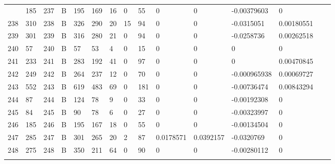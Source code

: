 \begin{longtable}{lllllllllllllll}
\begin{comment}
	237 & 185               & 237 & B   & 195               & 169               & 16                & 0    & 55         & 0              & 0              & -0.00379603   & 0            \\
	238 & 310               & 238 & B   & 326               & 290               & 20                & 15   & 94         & 0              & 0              & -0.0315051    & 0.00180551   \\
	239 & 301               & 239 & B   & 316               & 280               & 21                & 0    & 94         & 0              & 0              & -0.0258736    & 0.00262518   \\
	240 & 57                & 240 & B   & 57                & 53                & 4                 & 0    & 15         & 0              & 0              & 0             & 0            \\
	241 & 233               & 241 & B   & 283               & 192               & 41                & 0    & 97         & 0              & 0              & 0             & 0.00470845   \\
	242 & 249               & 242 & B   & 264               & 237               & 12                & 0    & 70         & 0              & 0              & -0.000965938  & 0.00069727   \\
	243 & 552               & 243 & B   & 619               & 483               & 69                & 0    & 181        & 0              & 0              & -0.00736474   & 0.00843294   \\
	244 & 87                & 244 & B   & 124               & 78                & 9                 & 0    & 33         & 0              & 0              & -0.00192308   & 0            \\
	245 & 84                & 245 & B   & 90                & 78                & 6                 & 0    & 27         & 0              & 0              & -0.00323997   & 0            \\
	246 & 185               & 246 & B   & 195               & 167               & 18                & 0    & 55         & 0              & 0              & -0.00134504   & 0            \\
	247 & 285               & 247 & B   & 301               & 265               & 20                & 2    & 87         & 0.0178571      & 0.0392157      & -0.0320769    & 0            \\
	248 & 275               & 248 & B   & 350               & 211               & 64                & 0    & 90         & 0              & 0              & -0.00280112   & 0            \\

\end{comment}
\end{longtable}
